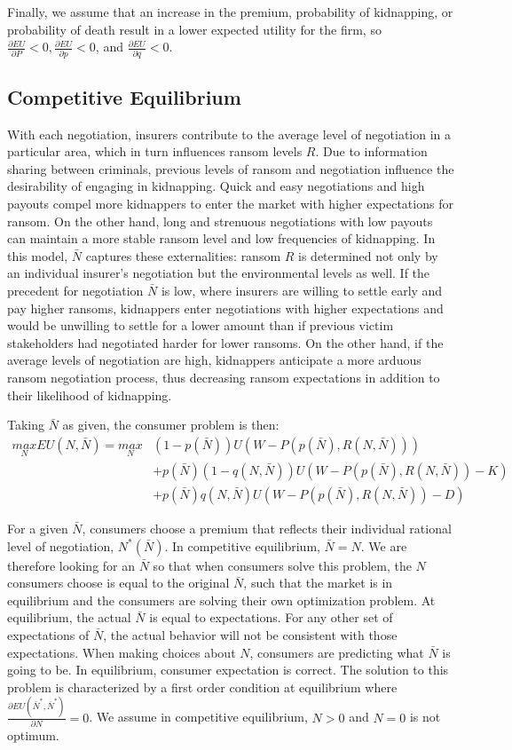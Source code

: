 \documentclass[12pt]{article}
\theoremstyle{plain}
\begin{document}
Finally, we assume that an increase in the premium, probability of kidnapping, or probability of death result in a lower expected utility for the firm, so $\frac{\partial EU}{\partial P} < 0, \frac{\partial EU}{\partial p} < 0$, and $\frac{\partial EU}{\partial q} < 0$.

\subsection{Competitive Equilibrium}

With each negotiation, insurers contribute to the average level of negotiation in a particular area, which in turn influences ransom levels $R$. Due to information sharing between criminals, previous levels of ransom and negotiation influence the desirability of engaging in kidnapping. Quick and easy negotiations and high payouts compel more kidnappers to enter the market with higher expectations for ransom. On the other hand, long and strenuous negotiations with low payouts can maintain a more stable ransom level and low frequencies of kidnapping. In this model, $\bar{N}$ captures these externalities: ransom $R$ is determined not only by an individual insurer's negotiation but the environmental levels as well. If the precedent for negotiation $\bar{N}$ is low, where insurers are willing to settle early and pay higher ransoms, kidnappers enter negotiations with higher expectations and would be unwilling to settle for a lower amount than if previous victim stakeholders had negotiated harder for lower ransoms. On the other hand, if the average levels of negotiation are high, kidnappers anticipate a more arduous ransom negotiation process, thus decreasing ransom expectations in addition to their likelihood of kidnapping.

Taking $\bar{N}$ as given, the consumer problem is then:
\begin{align*}
\underset{N}{max}EU(N, \bar{N}) = \underset{N}{max}&(1-p(\bar{N}))U(W-P(p(\bar{N}), R(N, \bar{N}))) \\
&+ p(\bar{N})(1-q(N, \bar{N}))U(W-P(p(\bar{N}), R(N, \bar{N}))-K) \\
&+ p(\bar{N})q(N, \bar{N})U(W-P(p(\bar{N}), R(N, \bar{N}))-D)
\end{align*}

For a given $\bar{N}$, consumers choose a premium that reflects their individual rational level of negotiation, $N^*(\bar{N})$. In competitive equilibrium, $\bar{N} = N$. We are therefore looking for an $\bar{N}$ so that when consumers solve this problem, the $N$ consumers choose is equal to the original $\bar{N}$, such that the market is in equilibrium and the consumers are solving their own optimization problem. At equilibrium, the actual $\bar{N}$ is equal to expectations. For any other set of expectations of $\bar{N}$, the actual behavior will not be consistent with those expectations. When making choices about $N$, consumers are predicting what $\bar{N}$ is going to be. In equilibrium, consumer expectation is correct. The solution to this problem is characterized by a first order condition at equilibrium where $\frac{\partial EU(\bar{N}^*, \bar{N}^*)}{\partial N} = 0$. We assume in competitive equilibrium, $N>0$ and $N=0$ is not optimum.
\end{document}
